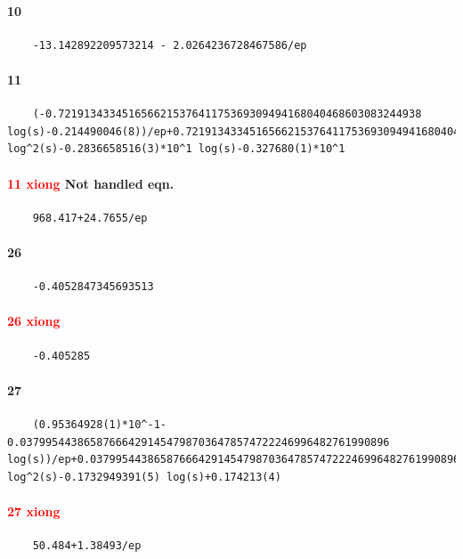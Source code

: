 \documentclass{article}
\newcommand{\WN}[1]{\textcolor{RawSienna}{#1}}
\newcommand{\WNNH}{\WN{Not handled eqn. }}
\begin{document}
\paragraph{10}
\begin{verbatim}
	-13.142892209573214 - 2.0264236728467586/ep
\end{verbatim}
\paragraph{11}
\begin{verbatim}
	(-0.721913433451656621537641175369309494168040468603083244938 log(s)-0.214490046(8))/ep+0.721913433451656621537641175369309494168040468603083244938 log^2(s)-0.2836658516(3)*10^1 log(s)-0.327680(1)*10^1
\end{verbatim}
\paragraph{\textcolor{red}{11 xiong}	\WNNH}
\begin{verbatim}
	968.417+24.7655/ep
\end{verbatim}
\paragraph{26}
\begin{verbatim}
	-0.4052847345693513
\end{verbatim}
\paragraph{\textcolor{red}{26 xiong}}
\begin{verbatim}
	-0.405285
\end{verbatim}
\paragraph{27}
\begin{verbatim}
	(0.95364928(1)*10^-1-0.0379954438658766642914547987036478574722246996482761990896 log(s))/ep+0.0379954438658766642914547987036478574722246996482761990896 log^2(s)-0.1732949391(5) log(s)+0.174213(4)
\end{verbatim}
\paragraph{\textcolor{red}{27 xiong}}
\begin{verbatim}
	50.484+1.38493/ep
\end{verbatim}
\end{document}
